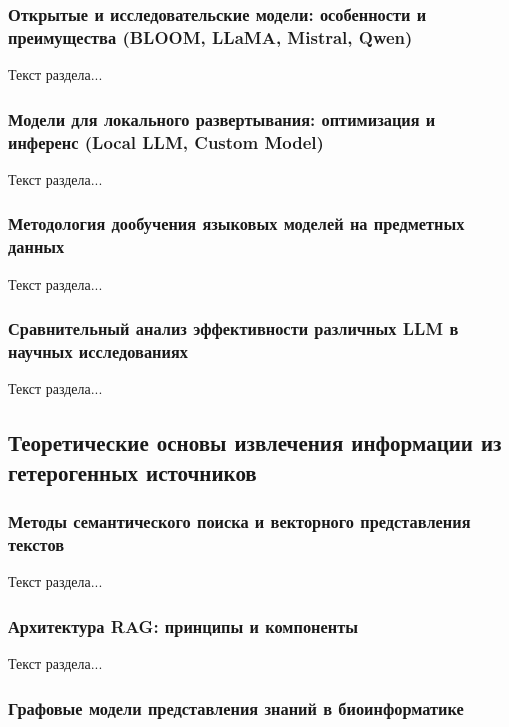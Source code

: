 \subsubsection{Открытые и исследовательские модели: особенности и преимущества (BLOOM, LLaMA, Mistral, Qwen)}

Текст раздела...

\subsubsection{Модели для локального развертывания: оптимизация и инференс (Local LLM, Custom Model)}

Текст раздела...

\subsubsection{Методология дообучения языковых моделей на предметных данных}

Текст раздела...

\subsubsection{Сравнительный анализ эффективности различных LLM в научных исследованиях}

Текст раздела...

\subsection{Теоретические основы извлечения информации из гетерогенных источников}

\subsubsection{Методы семантического поиска и векторного представления текстов}

Текст раздела...

\subsubsection{Архитектура RAG: принципы и компоненты}

Текст раздела...

\subsubsection{Графовые модели представления знаний в биоинформатике}

